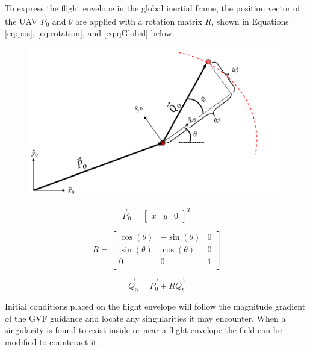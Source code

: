 \documentclass[conf]{new-aiaa}
\begin{document}
To express the flight envelope in the global inertial frame, the position vector of the UAV $\overrightarrow{P}_0$ and $\theta$ are applied with a rotation matrix $R$, shown in Equations \ref{eq:pos}, \ref{eq:rotation}, and \ref{eq:qGlobal} below. 


\begin{figure}[H]
	\centering
	\includegraphics[width=0.7\linewidth]{Figures/methods/flightEnvelope}
	\caption{}
	\label{fig:flightenvelope}
\end{figure}


\begin{equation}
\label{eq:rotation}
\overrightarrow{P}_0 = \begin{bmatrix}
x & y & 0
\end{bmatrix}^T
\end{equation}


\begin{equation}
\label{eq:qGlobal}
   R=\begin{bmatrix}
	\cos(\theta) & -\sin(\theta) & 0 \\
	\sin(\theta) & \cos(\theta) & 0 \\
	0 & 0 & 1 \\
\end{bmatrix}
\end{equation}


\begin{equation}
\label{eq:pos}
\overrightarrow{Q}_0 = \overrightarrow{P_0} + R  \overrightarrow{Q_b}
\end{equation}


Initial conditions placed on the flight envelope will follow the magnitude gradient of the GVF guidance and locate any singularities it may encounter. When a singularity is found to exist inside or near a flight envelope the field can be modified to counteract it. 
\end{document}

